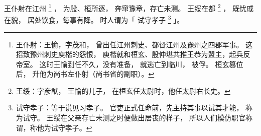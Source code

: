 
\switchcolumn*[\section{}]

王仆射在江州%
\footnote{%
    王仆射：王愉，字茂和，
            曾出任江州刺史、都督江州及豫州之四郡军事。
            这招致豫州刺史庾楷的怨恨，
            庾楷就和桓玄、殷仲堪共推王恭为盟主，起兵反帝室。
            这时王愉到任不久，没有准备，
            就逃亡到临川，
            被俘。
            桓玄篡位后，
            升他为尚书左仆射（尚书省的副职）。
}%
，
为殷、桓所逐，
奔窜豫章，存亡未测。
王绥在都%
\footnote{%
    王绥：字彦猷，
          王愉的儿子，
          在桓玄任太尉时，他任太尉右长史。
}%
，
既忧戚在貌，
居处饮食，每事有降。
时人谓为「
    试守孝子%
    \footnote{%
        试守孝子：等于说见习孝子。
                  官吏正式任命前，先主持其事以试其才能，
                  称为试守。
                  王绥在父亲存亡未测之时便做出居丧的样子，
                  所以人们模仿职官称谓，称他为试守孝子。
    }%
」。

\switchcolumn



